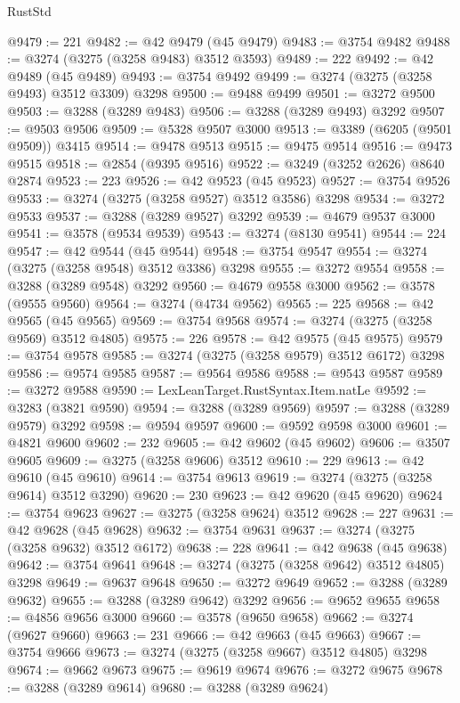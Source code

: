\begin{lexlean}{RustStd}
\begin{coremodule}
@9479 := 221
@9482 := @42 @9479 (@45 @9479)
@9483 := @3754 @9482
@9488 := @3274 (@3275 (@3258 @9483) @3512 @3593)
@9489 := 222
@9492 := @42 @9489 (@45 @9489)
@9493 := @3754 @9492
@9499 := @3274 (@3275 (@3258 @9493) @3512 @3309) @3298
@9500 := @9488 @9499
@9501 := @3272 @9500
@9503 := @3288 (@3289 @9483)
@9506 := @3288 (@3289 @9493) @3292
@9507 := @9503 @9506
@9509 := @5328 @9507 @3000
@9513 := @3389 (@6205 (@9501 @9509)) @3415
@9514 := @9478 @9513
@9515 := @9475 @9514
@9516 := @9473 @9515
@9518 := @2854 (@9395 @9516)
@9522 := @3249 (@3252 @2626) @8640 @2874
@9523 := 223
@9526 := @42 @9523 (@45 @9523)
@9527 := @3754 @9526
@9533 := @3274 (@3275 (@3258 @9527) @3512 @3586) @3298
@9534 := @3272 @9533
@9537 := @3288 (@3289 @9527) @3292
@9539 := @4679 @9537 @3000
@9541 := @3578 (@9534 @9539)
@9543 := @3274 (@8130 @9541)
@9544 := 224
@9547 := @42 @9544 (@45 @9544)
@9548 := @3754 @9547
@9554 := @3274 (@3275 (@3258 @9548) @3512 @3386) @3298
@9555 := @3272 @9554
@9558 := @3288 (@3289 @9548) @3292
@9560 := @4679 @9558 @3000
@9562 := @3578 (@9555 @9560)
@9564 := @3274 (@4734 @9562)
@9565 := 225
@9568 := @42 @9565 (@45 @9565)
@9569 := @3754 @9568
@9574 := @3274 (@3275 (@3258 @9569) @3512 @4805)
@9575 := 226
@9578 := @42 @9575 (@45 @9575)
@9579 := @3754 @9578
@9585 := @3274 (@3275 (@3258 @9579) @3512 @6172) @3298
@9586 := @9574 @9585
@9587 := @9564 @9586
@9588 := @9543 @9587
@9589 := @3272 @9588
@9590 := LexLeanTarget.RustSyntax.Item.natLe
@9592 := @3283 (@3821 @9590)
@9594 := @3288 (@3289 @9569)
@9597 := @3288 (@3289 @9579) @3292
@9598 := @9594 @9597
@9600 := @9592 @9598 @3000
@9601 := @4821 @9600
@9602 := 232
@9605 := @42 @9602 (@45 @9602)
@9606 := @3507 @9605
@9609 := @3275 (@3258 @9606) @3512
@9610 := 229
@9613 := @42 @9610 (@45 @9610)
@9614 := @3754 @9613
@9619 := @3274 (@3275 (@3258 @9614) @3512 @3290)
@9620 := 230
@9623 := @42 @9620 (@45 @9620)
@9624 := @3754 @9623
@9627 := @3275 (@3258 @9624) @3512
@9628 := 227
@9631 := @42 @9628 (@45 @9628)
@9632 := @3754 @9631
@9637 := @3274 (@3275 (@3258 @9632) @3512 @6172)
@9638 := 228
@9641 := @42 @9638 (@45 @9638)
@9642 := @3754 @9641
@9648 := @3274 (@3275 (@3258 @9642) @3512 @4805) @3298
@9649 := @9637 @9648
@9650 := @3272 @9649
@9652 := @3288 (@3289 @9632)
@9655 := @3288 (@3289 @9642) @3292
@9656 := @9652 @9655
@9658 := @4856 @9656 @3000
@9660 := @3578 (@9650 @9658)
@9662 := @3274 (@9627 @9660)
@9663 := 231
@9666 := @42 @9663 (@45 @9663)
@9667 := @3754 @9666
@9673 := @3274 (@3275 (@3258 @9667) @3512 @4805) @3298
@9674 := @9662 @9673
@9675 := @9619 @9674
@9676 := @3272 @9675
@9678 := @3288 (@3289 @9614)
@9680 := @3288 (@3289 @9624)

\end{coremodule}
\end{lexlean}
